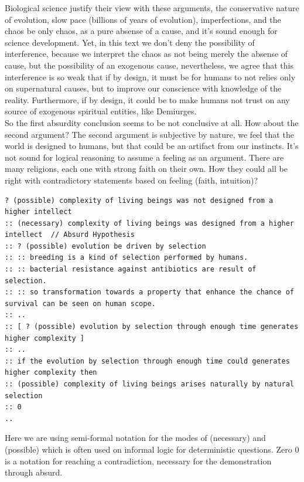 \documentclass[12pt,a4paper]{article}
\begin{document}
Biological science justify their view with these arguments, the conservative nature of evolution, slow pace (billions of years of evolution), imperfections, and the chaos be only chaos, as a pure absense of a cause, and it's sound enough for science development. Yet, in this text we don't deny the possibility of interference, because we interpret the chaos as not being merely the absense of cause, but the possibility of an exogenous cause, nevertheless, we agree that this interference is so weak that if by design, it must be for humans to not relies only on supernatural causes, but to improve our conscience with knowledge of the reality. Furthermore, if by design, it could be to make humans not trust on any source of exogenous spiritual entities, like Demiurges.\\

So the first absurdity conclusion seems to be not conclusive at all. How about the second argument? The second argument is subjective by nature, we feel that the world is designed to humans, but that could be an artifact from our instincts. It's not sound for logical reasoning to assume a feeling as an argument. There are many religions, each one with strong faith on their own. How they could all be right with contradictory statements based on feeling (faith, intuition)? \\

\begin{lstlisting}
? (possible) complexity of living beings was not designed from a higher intellect 
:: (necessary) complexity of living beings was designed from a higher intellect  // Absurd Hypothesis
:: ? (possible) evolution be driven by selection
:: :: breeding is a kind of selection performed by humans.
:: :: bacterial resistance against antibiotics are result of selection.
:: :: so transformation towards a property that enhance the chance of survival can be seen on human scope.
:: ..
:: [ ? (possible) evolution by selection through enough time generates higher complexity ]
:: ..
:: if the evolution by selection through enough time could generates higher complexity then 
:: (possible) complexity of living beings arises naturally by natural selection 
:: 0 
.. 
\end{lstlisting}

Here we are using semi-formal notation for the modes of (necessary) and (possible) which is often used on informal logic for deterministic questions. Zero $0$ is a notation for reaching a contradiction, necessary for the demonstration through absurd. \\
\end{document}
